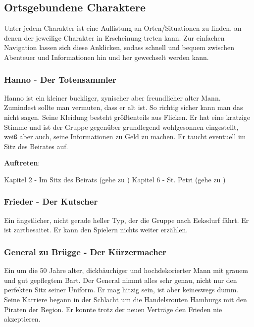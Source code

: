 
\subsection{Ortsgebundene Charaktere}

Unter jedem Charakter ist eine Auflistung an Orten/Situationen zu finden, an denen der jeweilige Charakter in Erscheinung treten kann. Zur einfachen Navigation lassen sich diese Anklicken, sodass schnell und bequem zwischen Abenteuer und Informationen hin und her gewechselt werden kann.

\subsubsection*{Hanno - Der Totensammler}
\label{Hanno}

Hanno ist ein kleiner buckliger, zynischer aber freundlicher alter Mann. Zumindest sollte man vermuten, dass er alt ist. So richtig sicher kann man das nicht sagen. Seine Kleidung besteht größtenteils aus Flicken. Er hat eine kratzige Stimme und ist der Gruppe gegenüber grundlegend wohlgesonnen eingestellt, weiß aber auch, seine Informationen zu Geld zu machen. Er taucht eventuell im Sitz des Beirates auf.

\textbf{Auftreten}:

Kapitel 2 - Im Sitz des Beirats (gehe zu \blue{\ref{tot}})
Kapitel 6 - St. Petri (gehe zu \blue{\ref{hinten}})

\subsubsection*{Frieder - Der Kutscher}
\label{Frieder}

Ein ängstlicher, nicht gerade heller Typ, der die Gruppe nach Eeksdurf fährt. Er ist zartbesaitet. Er kann den Spielern nichts weiter erzählen.

\subsubsection*{General zu Brügge - Der Kürzermacher}
\label{Brügge}

Ein um die 50 Jahre alter, dickbäuchiger und hochdekorierter Mann mit grauem und gut gepflegtem Bart. Der General nimmt alles sehr genau, nicht nur den perfekten Sitz seiner Uniform. Er mag hitzig sein, ist aber keineswegs dumm. Seine Karriere begann in der Schlacht um die Handelsrouten Hamburgs mit den Piraten der Region. Er konnte trotz der neuen Verträge den Frieden nie akzeptieren.

